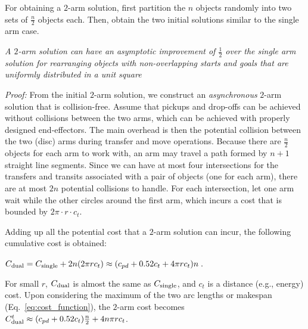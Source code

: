 For obtaining a $2$-arm solution, first partition the $n$ objects randomly into two sets of $\frac{n}{2}$ objects each. Then, obtain the two initial solutions similar to the single arm case.  

\begin{corollary}
	\textit{A $2$-arm solution can have an asymptotic improvement of $\frac{1}{2}$ over the single arm solution for rearranging objects with non-overlapping starts and goals that are uniformly distributed in a unit square}
	\label{thm:karm}
\end{corollary}

\textit{Proof: }
From the initial $2$-arm solution, we construct an {\em asynchronous} $2$-arm 
solution that is collision-free. Assume that pickups and drop-offs can be achieved without collisions between the two arms, which can be achieved with properly designed end-effectors. The main overhead is then the potential collision between the two (disc) arms during transfer and move operations. Because there are $\frac{n}{2}$ objects for each arm to work 
with, an arm may travel a path formed by $n + 1$ straight line 
segments. 
Since we can have at most four intersections for the transfers and transits associated with a pair of objects (one for each arm), there are at most $2n$ potential collisions to handle. For each intersection, let one 
arm wait while the other circles around the first arm, which incurs a cost that is bounded by $2\pi \cdot r \cdot c_t$. 

Adding up all the potential cost that a $2$-arm solution can incur, the following cumulative cost is obtained:


{\centerline
{
$C_{\rm dual} = C_{\rm single} + 2n(2\pi rc_t) \approx (c_{pd} + 0.52c_t + 4\pi rc_t)n\;.$
}
}

\noindent For small $r$, $C_{\rm dual}$ is almost the same as $C_{\rm single}$, and
$c_t$ is a distance (e.g., energy) cost. Upon considering the maximum of the two arc lengths or makespan (Eq.~\ref{eq:cost_function}),
the $2$-arm cost becomes $C_{\rm dual}^t \approx (c_{pd} + 0.52c_t)\frac{n}{2} + 4n\pi rc_t$.

